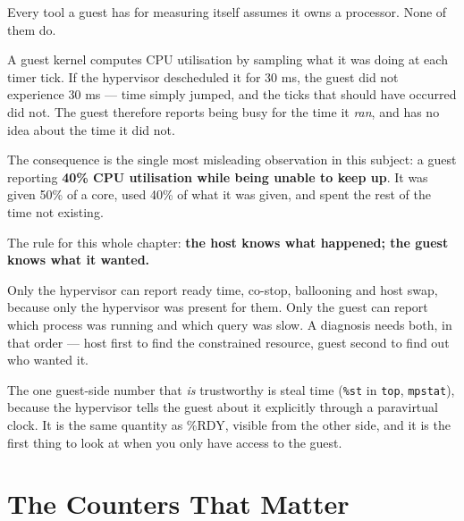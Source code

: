 Every tool a guest has for measuring itself assumes it owns a processor. None
of them do.

A guest kernel computes CPU utilisation by sampling what it was doing at each
timer tick. If the hypervisor descheduled it for 30 ms, the guest did not
experience 30 ms --- time simply jumped, and the ticks that should have
occurred did not. The guest therefore reports being busy for the time it
\emph{ran}, and has no idea about the time it did not.

The consequence is the single most misleading observation in this subject: a
guest reporting \textbf{40\% CPU utilisation while being unable to keep up}.
It was given 50\% of a core, used 40\% of what it was given, and spent the rest
of the time not existing.

\begin{conceptbox}
The rule for this whole chapter: \textbf{the host knows what happened; the
guest knows what it wanted.}

\smallskip
Only the hypervisor can report ready time, co-stop, ballooning and host swap,
because only the hypervisor was present for them. Only the guest can report
which process was running and which query was slow. A diagnosis needs both, in
that order --- host first to find the constrained resource, guest second to
find out who wanted it.

\smallskip
The one guest-side number that \emph{is} trustworthy is steal time
(\texttt{\%st} in \texttt{top}, \texttt{mpstat}), because the hypervisor tells
the guest about it explicitly through a paravirtual clock. It is the same
quantity as \%RDY, visible from the other side, and it is the first thing to
look at when you only have access to the guest.
\end{conceptbox}

\section{The Counters That Matter}

